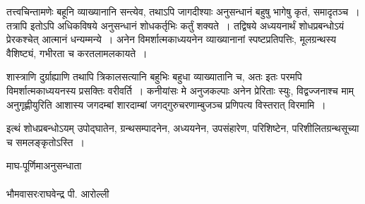	तत्त्वचिन्तामणेः बहूनि व्याख्यानानि सन्त्येव, तथाऽपि जागदीश्याः अनुसन्धानं बहुषु भागेषु कृतं, समादृतञ्च~। तत्रापि इतोऽपि अधिकविषये अनुसन्धानं शोधकर्तृभिः कर्तुं शक्यते~। तद्विषये अध्ययनार्थं शोधप्रबन्धोऽयं प्रेरकश्चेत् आत्मानं धन्यम्मन्ये~। अनेन विमर्शात्मकाध्ययनेन व्याख्यानानां स्पष्टप्रतिपत्तिः, मूलग्रन्थस्य वैशिष्ट्यं, गभीरता च करतलामलकायते~। 

	शास्त्राणि दुर्ग्राह्याणि तथापि त्रिकालसत्यानि बहुभिः बहुधा व्याख्यातानि च, अतः इतः परमपि विमर्शात्मकाध्ययनस्य प्रसक्तिः वरीवर्ति~। कनीयांसः मे अनुजकल्पाः अनेन प्रेरिताः स्युः, विद्वज्जनाश्च माम् अनुगृह्णीयुरिति आशास्य जगदम्बां शारदाम्बां जगद्गुरुचरणाम्बुजञ्च प्रणिपत्य विस्तरात् विरमामि~।
	
	इत्थं शोधप्रबन्धोऽयम् उपोद्घातेन, ग्रन्थसम्पादनेन, अध्ययनेन, उपसंहारेण, परिशिष्टेन, परिशीलितग्रन्थसूच्या च समलङ्कृतोऽस्ति~।
\bigskip

\noindent									
माघ-पूर्णिमा\hfill अनुसन्धाता\\ \\
भौमवासरः\hfill {\s राघवेन्द्र पी. आरोल्ली}
